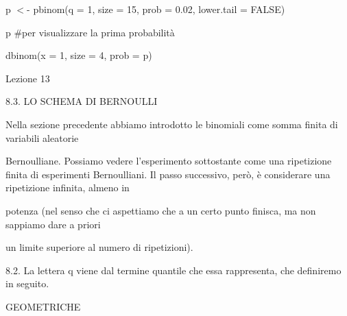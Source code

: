 \documentclass[a4paper,portrait,12pt]{article}
\begin{document}
\begin{flushleft}
p $<$- pbinom(q = 1, size = 15, prob = 0.02, lower.tail = FALSE)
\end{flushleft}


\begin{flushleft}
p \#per visualizzare la prima probabilit\`{a}
\end{flushleft}


\begin{flushleft}
dbinom(x = 1, size = 4, prob = p)
\end{flushleft}


\begin{flushleft}
Lezione 13
\end{flushleft}





\begin{flushleft}
8.3. LO SCHEMA DI BERNOULLI
\end{flushleft}


\begin{flushleft}
Nella sezione precedente abbiamo introdotto le binomiali come somma finita di variabili aleatorie
\end{flushleft}


\begin{flushleft}
Bernoulliane. Possiamo vedere l'esperimento sottostante come una ripetizione finita di esperimenti Bernoulliani. Il passo successivo, per\`{o}, \`{e} considerare una ripetizione infinita, almeno in
\end{flushleft}


\begin{flushleft}
potenza (nel senso che ci aspettiamo che a un certo punto finisca, ma non sappiamo dare a priori
\end{flushleft}


\begin{flushleft}
un limite superiore al numero di ripetizioni).
\end{flushleft}


\begin{flushleft}
8.2. La lettera q viene dal termine quantile che essa rappresenta, che definiremo in seguito.
\end{flushleft}





\begin{flushleft}
 GEOMETRICHE
\end{flushleft}
\end{document}
